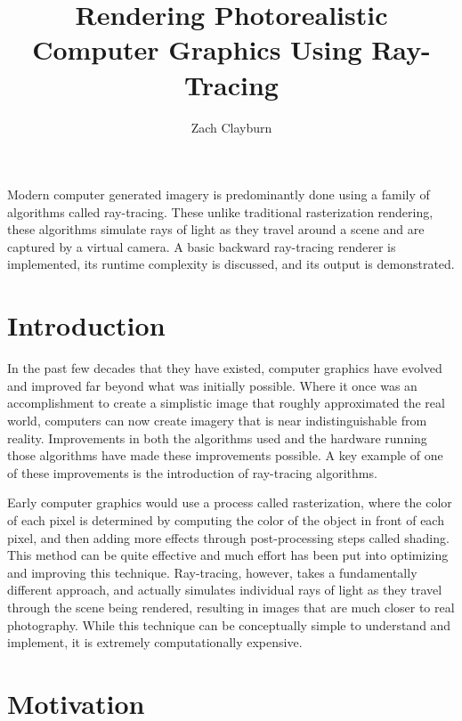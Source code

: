 \documentclass[10pt]{IEEEtran}
\title{Rendering Photorealistic Computer Graphics Using Ray-Tracing}
\author{Zach Clayburn}
\renewenvironment{abstract}{
    \small
    \begin{center}
    \bfseries \abstractname\vspace{-.5em}\vspace{0pt}
    \end{center}
    \list{}{%
        \setlength{\leftmargin}{4mm}
        \setlength{\rightmargin}{\leftmargin}
    }
    \item\relax
}{\endlist}
\begin{document}
\maketitle


\begin{abstract}

Modern computer generated imagery is predominantly done using a family of algorithms called
ray-tracing. These unlike traditional rasterization rendering, these algorithms simulate rays of
light as they travel around a scene and are captured by a virtual camera. A basic backward
ray-tracing renderer is implemented, its runtime complexity is discussed, and its output is
demonstrated.

\end{abstract}

\section*{Introduction}

In the past few decades that they have existed, computer graphics have evolved and improved far
beyond what was initially possible. Where it once was an accomplishment to create a simplistic image
that roughly approximated the real world, computers can now create imagery that is near
indistinguishable from reality. Improvements in both the algorithms used and the hardware running
those algorithms have made these improvements possible. A key example of one of these improvements
is the introduction of ray-tracing algorithms.

Early computer graphics would use a process called rasterization, where the color of each pixel is
determined by computing the color of the object in front of each pixel, and then adding more effects
through post-processing steps called shading. This method can be quite effective and much effort has
been put into optimizing and improving this technique. Ray-tracing, however, takes a fundamentally
different approach, and actually simulates individual rays of light as they travel through the scene
being rendered, resulting in images that are much closer to real photography. While this technique
can be conceptually simple to understand and implement, it is extremely computationally expensive.

\section*{Motivation}
\end{document}
